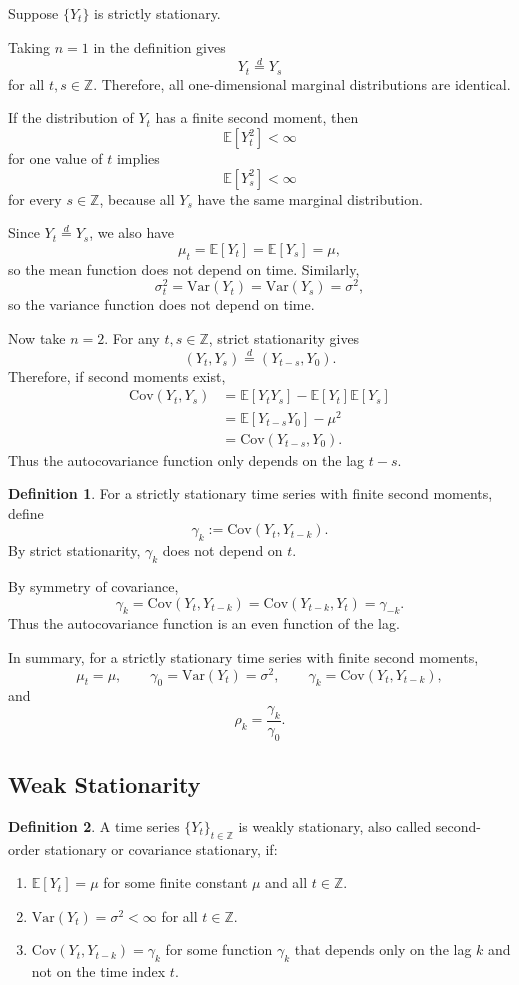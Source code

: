 \documentclass[12pt,oneside]{book}
\numberwithin{equation}{section}
\theoremstyle{definition}
\newtheorem{definition}{Definition}[section]
\theoremstyle{plain}
\theoremstyle{remark}
\newcommand{\Z}{\mathbb{Z}}
\newcommand{\E}{\mathbb{E}}
\newcommand{\Var}{\mathrm{Var}}
\newcommand{\Cov}{\mathrm{Cov}}
\begin{document}
Suppose $\{Y_t\}$ is strictly stationary.

Taking $n=1$ in the definition gives
\[
Y_t \overset{d}{=} Y_s
\]
for all $t,s\in\Z$. Therefore, all one-dimensional marginal distributions are identical.

If the distribution of $Y_t$ has a finite second moment, then
\[
\E[Y_t^2] < \infty
\]
for one value of $t$ implies
\[
\E[Y_s^2]<\infty
\]
for every $s\in\Z$, because all $Y_s$ have the same marginal distribution.

Since $Y_t \overset{d}{=} Y_s$, we also have
\[
\mu_t
=
\E[Y_t]
=
\E[Y_s]
=
\mu,
\]
so the mean function does not depend on time. Similarly,
\[
\sigma_t^2
=
\Var(Y_t)
=
\Var(Y_s)
=
\sigma^2,
\]
so the variance function does not depend on time.

Now take $n=2$. For any $t,s\in\Z$, strict stationarity gives
\[
(Y_t,Y_s)
\overset{d}{=}
(Y_{t-s},Y_0).
\]
Therefore, if second moments exist,
\begin{align*}
\Cov(Y_t,Y_s)
&=
\E[Y_tY_s]-\E[Y_t]\E[Y_s] \\
&=
\E[Y_{t-s}Y_0]-\mu^2 \\
&=
\Cov(Y_{t-s},Y_0).
\end{align*}
Thus the autocovariance function only depends on the lag $t-s$.

\begin{definition}
For a strictly stationary time series with finite second moments, define
\[
\gamma_k
:=
\Cov(Y_t,Y_{t-k}).
\]
By strict stationarity, $\gamma_k$ does not depend on $t$.
\end{definition}

By symmetry of covariance,
\[
\gamma_k
=
\Cov(Y_t,Y_{t-k})
=
\Cov(Y_{t-k},Y_t)
=
\gamma_{-k}.
\]
Thus the autocovariance function is an even function of the lag.

In summary, for a strictly stationary time series with finite second moments,
\[
\mu_t=\mu,
\qquad
\gamma_0=\Var(Y_t)=\sigma^2,
\qquad
\gamma_k=\Cov(Y_t,Y_{t-k}),
\]
and
\[
\rho_k
=
\frac{\gamma_k}{\gamma_0}.
\]

\subsection{Weak Stationarity}

\begin{definition}
A time series $\{Y_t\}_{t\in\Z}$ is weakly stationary, also called second-order stationary or covariance stationary, if:
\begin{enumerate}
\item $\E[Y_t]=\mu$ for some finite constant $\mu$ and all $t\in\Z$.
\item $\Var(Y_t)=\sigma^2<\infty$ for all $t\in\Z$.
\item $\Cov(Y_t,Y_{t-k})=\gamma_k$ for some function $\gamma_k$ that depends only on the lag $k$ and not on the time index $t$.
\end{enumerate}
\end{definition}
\end{document}
